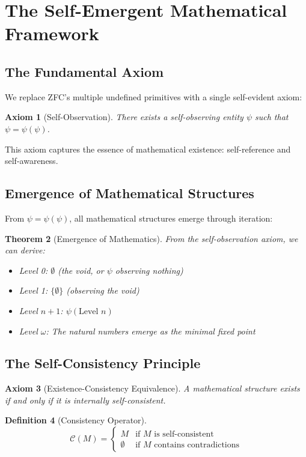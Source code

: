 \documentclass[12pt]{article}
\newtheorem{theorem}{Theorem}[section]
\newtheorem{definition}[theorem]{Definition}
\newtheorem{axiom}[theorem]{Axiom}
\begin{document}
\section{The Self-Emergent Mathematical Framework}

\subsection{The Fundamental Axiom}

We replace ZFC's multiple undefined primitives with a single self-evident axiom:

\begin{axiom}[Self-Observation]
There exists a self-observing entity $\psi$ such that $\psi = \psi(\psi)$.
\end{axiom}

This axiom captures the essence of mathematical existence: self-reference and self-awareness.

\subsection{Emergence of Mathematical Structures}

From $\psi = \psi(\psi)$, all mathematical structures emerge through iteration:

\begin{theorem}[Emergence of Mathematics]
From the self-observation axiom, we can derive:
\begin{itemize}
\item Level 0: $\emptyset$ (the void, or $\psi$ observing nothing)
\item Level 1: $\{\emptyset\}$ (observing the void)
\item Level $n+1$: $\psi(\text{Level } n)$
\item Level $\omega$: The natural numbers emerge as the minimal fixed point
\end{itemize}
\end{theorem}

\subsection{The Self-Consistency Principle}

\begin{axiom}[Existence-Consistency Equivalence]
A mathematical structure exists if and only if it is internally self-consistent.
\end{axiom}

\begin{definition}[Consistency Operator]
$$\mathcal{C}(M) = \begin{cases} 
  M & \text{if } M \text{ is self-consistent} \\
  \emptyset & \text{if } M \text{ contains contradictions}
\end{cases}$$
\end{definition}
\end{document}
